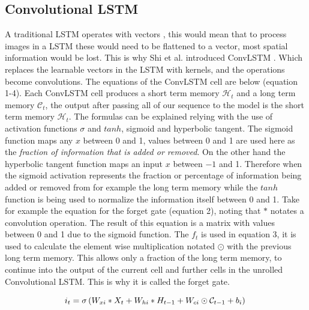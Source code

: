 \subsection{Convolutional LSTM}
A traditional LSTM operates with vectors \cite{lstm}, this would mean that to process images in a LSTM these would need to be flattened to a vector, most spatial information would be lost. This is why Shi et al. introduced ConvLSTM \cite{convlstm}.
Which replaces the learnable vectors in the LSTM with kernels, and the operations become convolutions.
The equations of the ConvLSTM cell are below (equation 1-4). Each ConvLSTM cell produces a short term memory $ \mathcal{H}_{t}$ and a long term memory $\mathcal{C}_{t}$,
the output after passing all of our sequence to the model is the short term memory $\mathcal{H}_{t}$. 
The formulas can be explained relying with the use of activation functions $\sigma$ and $tanh$, sigmoid and hyperbolic tangent.
The sigmoid function maps any $x$ between 0 and 1, values between 0 and 1 are used here as the \textit{fraction of information that is added or removed}.
On the other hand the hyperbolic tangent function maps an input $x$ between $-1$ and 1. Therefore when the sigmoid activation represents the fraction or percentage of information being added or removed from for example the
long term memory while the $tanh$ function is being used to normalize the information itself between 0 and 1.
Take for example the equation for the forget gate (equation 2), noting that $*$ notates a convolution operation.
The result of this equation is a matrix with values between 0 and 1 due to the sigmoid function.
The $f_t$ is used in equation 3, it is used to calculate the element wise multiplication notated $\odot$
with the previous long term memory. This allows only a fraction of the long term memory, to continue into the output of the
current cell and further cells in the unrolled Convolutional LSTM. This is why it is called the forget gate. 

\begin{equation}
  i_{t} = \sigma\left(W_{xi} * X_{t} + W_{hi} * H_{t-1} + W_{ci} \odot \mathcal{C}_{t-1} + b_{i}\right)\\
\end{equation}

